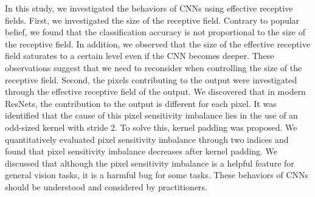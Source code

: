 \documentclass[letterpaper]{article} \usepackage{aaai22}  \usepackage{times}  \usepackage{helvet}  \usepackage{courier}  \usepackage[hyphens]{url}  \usepackage{graphicx} \urlstyle{rm} \def\UrlFont{\rm}  \usepackage{natbib}  \usepackage{caption} \DeclareCaptionStyle{ruled}{labelfont=normalfont,labelsep=colon,strut=off} \frenchspacing  \setlength{\pdfpagewidth}{8.5in}  \setlength{\pdfpageheight}{11in}  \usepackage{algorithm}
\begin{document}
In this study, we investigated the behaviors of CNNs using effective receptive fields. First, we investigated the size of the receptive field. Contrary to popular belief, we found that the classification accuracy is not proportional to the size of the receptive field. In addition, we observed that the size of the effective receptive field saturates to a certain level even if the CNN becomes deeper. These observations suggest that we need to reconsider when controlling the size of the receptive field. Second, the pixels contributing to the output were investigated through the effective receptive field of the output. We discovered that in modern ResNets, the contribution to the output is different for each pixel. It was identified that the cause of this pixel sensitivity imbalance lies in the use of an odd-sized kernel with stride 2. To solve this, kernel padding was proposed. We quantitatively evaluated pixel sensitivity imbalance through two indices and found that pixel sensitivity imbalance decreases after kernel padding. We discussed that although the pixel sensitivity imbalance is a helpful feature for general vision tasks, it is a harmful bug for some tasks. These behaviors of CNNs should be understood and considered by practitioners.




\end{document}
